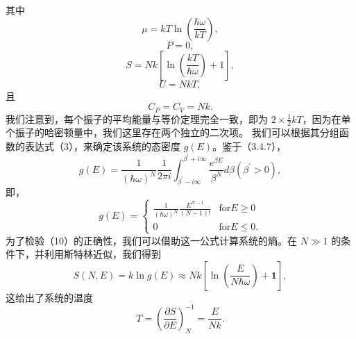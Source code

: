 其中
\begin{equation}\tag{3.5.56}\label{eq:3.5.56}
\mu = k T \ln \left( \frac { \hbar \omega } { k T } \right) ,
\end{equation}
\begin{equation}\tag{3.5.57}\label{eq:3.5.57}
P = 0 ,
\end{equation}
\begin{equation}\tag{3.5.58}\label{eq:3.5.58}
S = N k \left[ \ln \left( \frac { k T } { \hbar \omega } \right) + 1 \right] ,
\end{equation}
\begin{equation}\tag{3.5.59}\label{eq:3.5.59}
U = N k T ,
\end{equation}
且
\begin{equation}\tag{3.5.60}\label{eq:3.5.60}
C _ { P } = C _ { V } = N k .
\end{equation}
我们注意到，每个振子的平均能量与等价定理完全一致，即为 \(2 \times \frac{1}{2}kT\)，因为在单个振子的哈密顿量中，我们这里存在两个独立的二次项。
我们可以根据其分组函数的表达式（3），来确定该系统的态密度 \(g(E)\)。鉴于（3.4.7），
\begin{equation}\tag{3.5.61}\label{eq:3.5.61}
g ( E ) = \frac { 1 } { ( \hbar \omega ) ^{N} } \frac { 1 } { 2 \pi i } \int _ { \beta ^{\prime} - i \infty } ^{\beta ^ { \prime} + i \infty } \frac { e ^{\beta E} } { \beta ^{N} } d \beta  ( \beta ^{\prime} > 0 ) ,
\end{equation}
即，
\begin{equation}\tag{3.5.62}\label{eq:3.5.62}
g ( E ) = \left\{ \begin{array}{ll} { \frac { 1 } { ( \hbar \omega ) ^{N} } \frac { E ^{N - 1} } { ( N - 1 ) ! } } & { \mathrm { f o r }  E \geq 0 } \\{ 0 } & { \mathrm { f o r }  E \leq 0 . } \end{array} \right.
\end{equation}
为了检验（10）的正确性，我们可以借助这一公式计算系统的熵。在 \(N \gg 1\) 的条件下，并利用斯特林近似，我们得到
\begin{equation}\tag{3.5.63}\label{eq:3.5.63}
S ( N , E ) = k \ln g ( E ) \approx N k \left[ \ln \left( \frac { E } { N \hbar \omega } \right) + \mathbf { 1 } \right] ,
\end{equation}
这给出了系统的温度
\begin{equation}\tag{3.5.64}\label{eq:3.5.64}
T = \left( { \frac { \partial S } { \partial E } } \right) _ { N } ^{- 1} = { \frac { E } { N k } } .
\end{equation}
